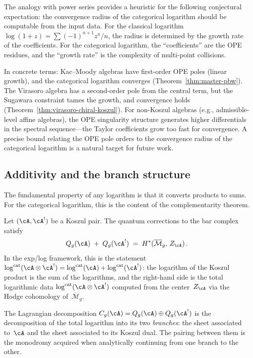 \begin{remark}
\label{rem:convergence-radius-ope}
The analogy with power series provides a heuristic for the following
conjectural expectation: the convergence radius of the categorical
logarithm should be computable from the input data.
For the classical logarithm $\log(1+z) = \sum (-1)^{n+1} z^n/n$, the
radius is determined by the growth rate of the coefficients.  For the
categorical logarithm, the ``coefficients'' are the OPE residues, and
the ``growth rate'' is the complexity of multi-point collisions.

In concrete terms: Kac--Moody algebras have first-order OPE poles
(linear growth), and the categorical logarithm converges
(Theorem~\ref{thm:master-pbw}).  The Virasoro algebra has a
second-order pole from the central term, but the Sugawara constraint
tames the growth, and convergence holds
(Theorem~\ref{thm:virasoro-chiral-koszul}).  For non-Koszul algebras
(e.g., admissible-level affine algebras), the OPE singularity structure
generates higher differentials in the spectral sequence---the Taylor
coefficients grow too fast for convergence.  A precise bound relating
the OPE pole orders to the convergence radius of the categorical
logarithm is a natural target for future work.
\end{remark}

\subsection{Additivity and the branch structure}
\label{subsec:additivity-branch}

The fundamental property of any logarithm is that it converts products
to sums.  For the categorical logarithm, this is the content of the
complementarity theorem.

\begin{proposition}
\label{prop:log-additivity}
Let $(\cA, \cA^!)$ be a Koszul pair.  The quantum corrections to the
bar complex satisfy
\[
Q_g(\cA) \;+\; Q_g(\cA^!)
\;=\; H^*(\overline{\mathcal{M}}_g,\, Z_\cA)\,.
\]
In the exp/log framework, this is the statement
$\log^{\mathrm{cat}}(\cA \otimes \cA^!) =
\log^{\mathrm{cat}}(\cA) + \log^{\mathrm{cat}}(\cA^!)$: the
logarithm of the Koszul product is the sum of the logarithms, and
the right-hand side is the total logarithmic data
$\log^{\mathrm{cat}}(\cA \otimes \cA^!)$ computed from the center~$Z_\cA$
via the Hodge cohomology of~$\overline{\mathcal{M}}_g$.

The Lagrangian decomposition
$C_g(\cA) = Q_g(\cA) \oplus Q_g(\cA^!)$ is the decomposition of the
total logarithm into its two \emph{branches}: the sheet associated
to~$\cA$ and the sheet associated to its Koszul dual.  The pairing
between them is the monodromy acquired when analytically continuing
from one branch to the other.
\end{proposition}

